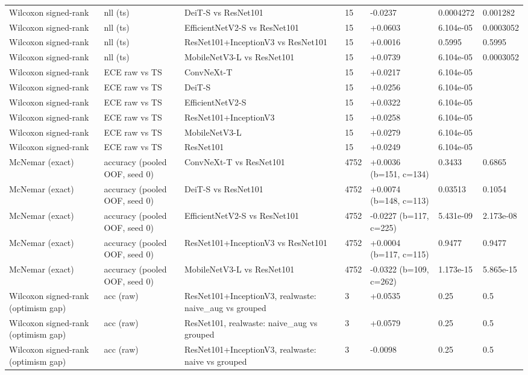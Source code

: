 \begin{table}[ht]
\begin{tabular}{lllllll}
Wilcoxon signed-rank & nll (ts) & DeiT-S vs ResNet101 & 15 & -0.0237 & 0.0004272 & 0.001282 \\
Wilcoxon signed-rank & nll (ts) & EfficientNetV2-S vs ResNet101 & 15 & +0.0603 & 6.104e-05 & 0.0003052 \\
Wilcoxon signed-rank & nll (ts) & ResNet101+InceptionV3 vs ResNet101 & 15 & +0.0016 & 0.5995 & 0.5995 \\
Wilcoxon signed-rank & nll (ts) & MobileNetV3-L vs ResNet101 & 15 & +0.0739 & 6.104e-05 & 0.0003052 \\
Wilcoxon signed-rank & ECE raw vs TS & ConvNeXt-T & 15 & +0.0217 & 6.104e-05 &  \\
Wilcoxon signed-rank & ECE raw vs TS & DeiT-S & 15 & +0.0256 & 6.104e-05 &  \\
Wilcoxon signed-rank & ECE raw vs TS & EfficientNetV2-S & 15 & +0.0322 & 6.104e-05 &  \\
Wilcoxon signed-rank & ECE raw vs TS & ResNet101+InceptionV3 & 15 & +0.0258 & 6.104e-05 &  \\
Wilcoxon signed-rank & ECE raw vs TS & MobileNetV3-L & 15 & +0.0279 & 6.104e-05 &  \\
Wilcoxon signed-rank & ECE raw vs TS & ResNet101 & 15 & +0.0249 & 6.104e-05 &  \\
McNemar (exact) & accuracy (pooled OOF, seed 0) & ConvNeXt-T vs ResNet101 & 4752 & +0.0036 (b=151, c=134) & 0.3433 & 0.6865 \\
McNemar (exact) & accuracy (pooled OOF, seed 0) & DeiT-S vs ResNet101 & 4752 & +0.0074 (b=148, c=113) & 0.03513 & 0.1054 \\
McNemar (exact) & accuracy (pooled OOF, seed 0) & EfficientNetV2-S vs ResNet101 & 4752 & -0.0227 (b=117, c=225) & 5.431e-09 & 2.173e-08 \\
McNemar (exact) & accuracy (pooled OOF, seed 0) & ResNet101+InceptionV3 vs ResNet101 & 4752 & +0.0004 (b=117, c=115) & 0.9477 & 0.9477 \\
McNemar (exact) & accuracy (pooled OOF, seed 0) & MobileNetV3-L vs ResNet101 & 4752 & -0.0322 (b=109, c=262) & 1.173e-15 & 5.865e-15 \\
Wilcoxon signed-rank (optimism gap) & acc (raw) & ResNet101+InceptionV3, realwaste: naive\_aug vs grouped & 3 & +0.0535 & 0.25 & 0.5 \\
Wilcoxon signed-rank (optimism gap) & acc (raw) & ResNet101, realwaste: naive\_aug vs grouped & 3 & +0.0579 & 0.25 & 0.5 \\
Wilcoxon signed-rank (optimism gap) & acc (raw) & ResNet101+InceptionV3, realwaste: naive vs grouped & 3 & -0.0098 & 0.25 & 0.5 \\

\end{tabular}
\end{table}

